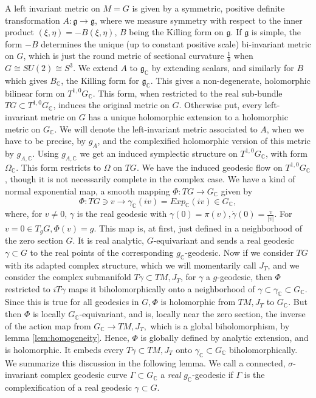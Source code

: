 \documentclass[12pt,reqno]{amsart}\usepackage{amssymb,amsmath,amscd,epsfig,amsthm,enumerate,import,eufrak}
\theoremstyle{definition}
\theoremstyle{remark}
\numberwithin{equation}{section}
\theoremstyle{plain}
\theoremstyle{definition}
\def \c {\mathbb{C}}
\def \mfg {\mathfrak{g}}
\theoremstyle{remark}
\numberwithin{theorem}{section}
\begin{document}
A left invariant metric on $M = G$ is given by a symmetric, positive definite transformation $A: \mathfrak{g} \to \mathfrak{g}$, where we measure symmetry with respect to the inner product $(\xi, \eta) = - B(\xi, \eta)$, $B$ being the Killing form on $\mathfrak{g}$. If $\mfg$ is simple, the form $-B$ determines the unique (up to constant positive scale) bi-invariant metric on $G$, which is just the round metric of sectional curvature $\frac18$ when $G \cong SU(2) \cong S^3$. We extend $A$ to $\mathfrak{g}_{\c}$ by extending scalars, and similarly for $B$ which gives $B_{\c}$, the Killing form for $\mathfrak{g}_{\c}$. This gives a non-degenerate, holomorphic bilinear form on $T^{1,0}G_{\c}$. This form, when restricted to the real sub-bundle $TG \subset T^{1,0}G_{\c}$, induces the original metric on $G$. Otherwise put, every left-invariant metric on $G$ has a unique holomorphic extension to a holomorphic metric on $G_{\c}$. We will denote the left-invariant metric associated to $A$, when we have to be precise, by $g_A$, and the complexified holomorphic version of this metric by $g_{A, \c}$. Using $g_{A, \c}$ we get an induced symplectic structure on $T^{1,0}G_{\c}$, with form $\Omega_{\c}$. This form restricts to $\Omega$ on $TG$. We have the induced geodesic flow on $T^{1,0}G_{\c}$, though it is not necessarily complete in the complex case. We have a kind of normal exponential map, a smooth mapping $\Phi: TG \to G_{\c}$ given by 
%
\begin{equation}  \label{eqn:Expdef}
	\Phi: TG \ni v \to \gamma_{\c}(i v) = Exp_{\c}(i v) \in G_{\c},
\end{equation} 
%
where, for $v \neq 0$, $\gamma$ is the real geodesic with $\gamma(0) = \pi(v), \dot{\gamma}(0) = \frac{v}{|v|}$. For $v = 0 \in T_gG, \Phi(v) = g$. This map is, at first, just defined in a neighborhood of the zero section $G$. It is real analytic, $G$-equivariant and sends a real geodesic $\gamma \subset G$ to the real points of the corresponding $g_{\c}$-geodesic. Now if we consider $TG$ with its adapted complex structure, which we will momentarily call $J_T$, and we consider the complex submanifold $T\gamma \subset TM, J_T$, for $\gamma$ a $g$-geodesic, then $\Phi$ restricted to $i T\gamma$ maps it biholomorphically onto a neighborhood of $\gamma \subset \gamma_{\c} \subset G_{\c}$. Since this is true for all geodesics in $G, \Phi$ is holomorphic from $TM, J_T$ to $G_{\c}$. But then $\Phi$ is locally $G_{\c}$-equivariant, and is, locally near the zero section, the inverse of the action map from $G_{\c} \to TM, J_T,$ which is a global biholomorphism, by lemma \ref{lem:homogeneity}. Hence, $\Phi$ is globally defined by analytic extension, and is holomorphic. It embeds every $T\gamma \subset TM, J_T$ onto $\gamma_{\c} \subset G_{\c}$ biholomorphically. We summarize this discussion in the following lemma. We call a connected, $\sigma$-invariant complex geodesic curve $\Gamma \subset G_{\c}$ a {\em real} $g_{\c}$-geodesic if $\Gamma$ is the complexification of a real geodesic $\gamma \subset G$.
\end{document}
